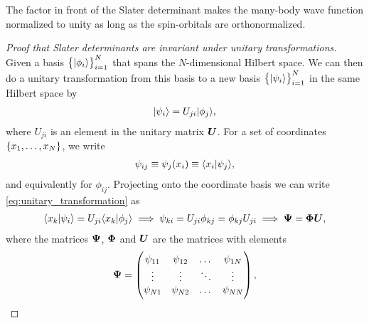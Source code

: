             The factor in front of the Slater determinant makes the many-body wave
            function normalized to unity as long as the spin-orbitals are
            orthonormalized.

            \begin{proof}[Proof that Slater determinants are invariant under unitary
                transformations]
                \label{proof:slater_determinants_invariant}
                Given a basis $\left\{ | \phi_i \rangle \right\}_{i = 1}^{N}$ that spans the
                $N$-dimensional Hilbert space. We can then do a unitary
                transformation from this basis to a new basis
                $\left\{ | \psi_i \rangle \right\}_{i = 1}^{N}$ in the same Hilbert space by
                \begin{align}
                    | \psi_i \rangle = U_{ji}| \phi_j \rangle,
                    \label{eq:unitary_transformation}
                \end{align}
                where $U_{ji}$ is an element in the unitary matrix $\boldsymbol{U}$.
                For a set of coordinates
                $\left\{ x_1, \dots, x_N \right\}$, we write
                \begin{align}
                    \psi_{ij} \equiv \psi_j(x_i)
                    \equiv \langle x_i | \psi_j \rangle,
                \end{align}
                and equivalently for $\phi_{ij}$. Projecting onto the coordinate
                basis we can write \autoref{eq:unitary_transformation} as
                \begin{gather}
                    \langle x_k | \psi_i \rangle
                    = U_{ji}\langle x_k | \phi_j \rangle
                    \implies
                    \psi_{ki} = U_{ji}\phi_{kj} = \phi_{kj}U_{ji}
                    \implies \boldsymbol{\Psi} = \boldsymbol{\Phi}\boldsymbol{U},
                \end{gather}
                where the matrices $\boldsymbol{\Psi}$, $\boldsymbol{\Phi}$ and $\boldsymbol{U}$ are
                the matrices with elements
                \begin{align}
                    \vfg{\Psi}
                    &= \begin{pmatrix}
                        \psi_{11} & \psi_{12} & \dots & \psi_{1N} \\
                        \vdots & \vdots & \ddots & \vdots \\
                        \psi_{N1} & \psi_{N2} & \dots & \psi_{NN}
                    \end{pmatrix}, \\

\end{align}
\end{proof}
